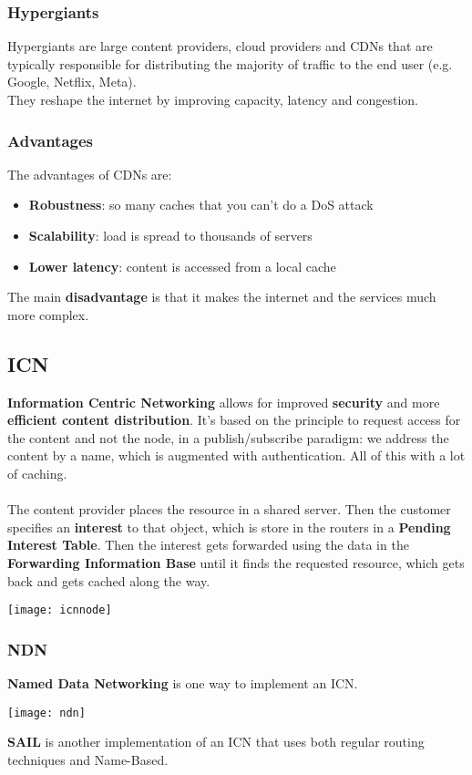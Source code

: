 \subsubsection{Hypergiants}
Hypergiants are large content providers, cloud providers and CDNs that are typically responsible for distributing the majority of traffic to the end user (e.g. Google, Netflix, Meta).\\
They reshape the internet by improving capacity, latency and congestion.

\subsubsection{Advantages}
The advantages of CDNs are:
\begin{itemize}
	\item \textbf{Robustness}: so many caches that you can't do a DoS attack
	\item \textbf{Scalability}: load is spread to thousands of servers
	\item \textbf{Lower latency}: content is accessed from a local cache
\end{itemize}
The main \textbf{disadvantage} is that it makes the internet and the services much more complex.

\subsection{ICN}
\textbf{Information Centric Networking} allows for improved \textbf{security} and more \textbf{efficient content distribution}. It's based on the principle to request access for the content and not the node, in a publish/subscribe paradigm: we address the content by a name, which is augmented with authentication. All of this with a lot of caching.\\\\

The content provider places the resource in a shared server. Then the customer specifies an \textbf{interest} to that object, which is store in the routers in a \textbf{Pending Interest Table}. Then the interest gets forwarded using the data in the \textbf{Forwarding Information Base} until it finds the requested resource, which gets back and gets cached along the way.

\begin{center}
	\texttt{[image: icnnode]}
\end{center}

\subsubsection{NDN}
\textbf{Named Data Networking} is one way to implement an ICN.
\begin{center}
	\texttt{[image: ndn]}
\end{center}
\textbf{SAIL} is another implementation of an ICN that uses both regular routing techniques and Name-Based.

